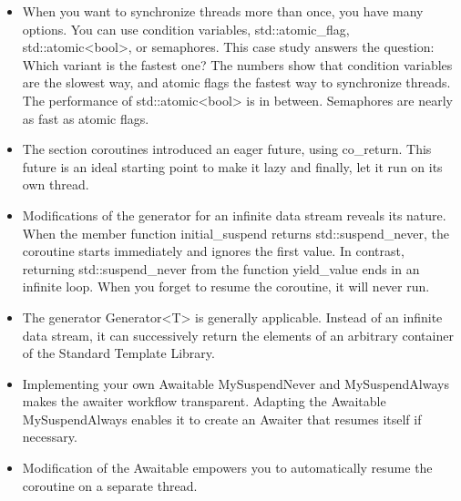 \begin{tcolorbox}[colback=mygreen!5!white,colframe=mygreen!75!black,title={Distilled Information}]
	
\begin{itemize}
\item 
When you want to synchronize threads more than once, you have many options. You can use condition variables, std::atomic\_flag, std::atomic<bool>, or semaphores. This case study answers the question: Which variant is the fastest one? The numbers show that condition variables are the slowest way, and atomic flags the fastest way to synchronize threads. The performance of std::atomic<bool> is in between. Semaphores are nearly as fast as atomic flags.

\item 
The section coroutines introduced an eager future, using co\_return. This future is an ideal starting point to make it lazy and finally, let it run on its own thread.

\item 
Modifications of the generator for an infinite data stream reveals its nature. When the member function initial\_suspend returns std::suspend\_never, the coroutine starts immediately and ignores the first value. In contrast, returning std::suspend\_never from the function yield\_value ends in an infinite loop. When you forget to resume the coroutine, it will never run.

\item 
The generator Generator<T> is generally applicable. Instead of an infinite data stream, it can successively return the elements of an arbitrary container of the Standard Template Library.

\item 
Implementing your own Awaitable MySuspendNever and MySuspendAlways makes the awaiter workflow transparent. Adapting the Awaitable MySuspendAlways enables it to create an Awaiter that resumes itself if necessary.

\item 
Modification of the Awaitable empowers you to automatically resume the coroutine on a separate thread.
\end{itemize}
	
\end{tcolorbox}




















